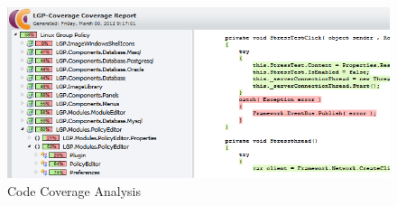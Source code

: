 		\begin{figure}[h!]
			\centering
			\includegraphics[scale=0.8]{pages/chapter4/figures/coverage-snippet.png}
			\vspace{-2mm}
			\caption{Code Coverage Analysis}
			\label{fig:MetricCodeCoverageAnalysis}
		\end{figure}

